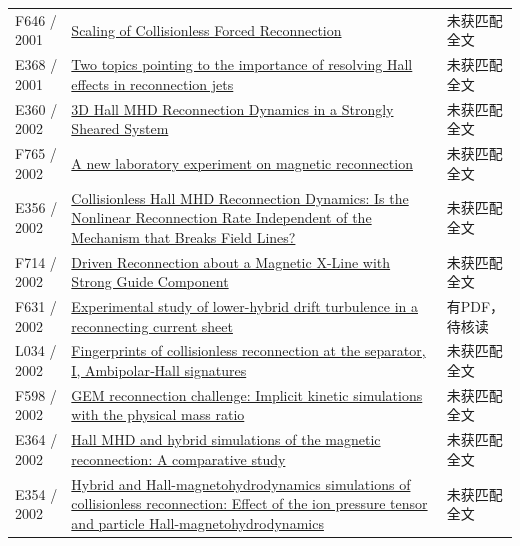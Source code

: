 \documentclass[UTF8,a4paper,11pt,openany,fontset=fandol]{ctexbook}
\begin{document}
\begin{longtable}{P{24mm}P{97mm}P{27mm}}
F646 / 2001 & \href{https://doi.org/10.1103/physrevlett.87.265003}{Scaling of Collisionless Forced Reconnection} & 未获匹配全文\\

E368 / 2001 & \href{https://ui.adsabs.harvard.edu/abs/2001sps..proc..140F/abstract}{Two topics pointing to the importance of resolving Hall effects in reconnection jets} & 未获匹配全文\\

E360 / 2002 & \href{http://ui.adsabs.harvard.edu/abs/2002AGUFMSM61A0471H/abstract}{3D Hall MHD Reconnection Dynamics in a Strongly Sheared System} & 未获匹配全文\\

F765 / 2002 & \href{https://doi.org/10.1063/1.1459455}{A new laboratory experiment on magnetic reconnection} & 未获匹配全文\\

E356 / 2002 & \href{https://ui.adsabs.harvard.edu/abs/2002AGUFMSM61A0472B/abstract}{Collisionless Hall MHD Reconnection Dynamics: Is the Nonlinear Reconnection Rate Independent of the Mechanism that Breaks Field Lines?} & 未获匹配全文\\

F714 / 2002 & \href{https://doi.org/10.1103/physrevlett.89.055002}{Driven Reconnection about a Magnetic X-Line with Strong Guide Component} & 未获匹配全文\\

F631 / 2002 & \href{https://doi.org/10.1063/1.1494433}{Experimental study of lower-hybrid drift turbulence in a reconnecting current sheet} & 有PDF，待核读\\

L034 / 2002 & \href{https://doi.org/10.1029/2001ja000126}{Fingerprints of collisionless reconnection at the separator,  I,  Ambipolar‐Hall signatures} & 未获匹配全文\\

F598 / 2002 & \href{https://doi.org/10.1029/2002gl015314}{GEM reconnection challenge: Implicit kinetic simulations with the physical mass ratio} & 未获匹配全文\\

E364 / 2002 & \href{https://ui.adsabs.harvard.edu/abs/2002AGUFMSM61A0480K/abstract}{Hall MHD and hybrid simulations of the magnetic reconnection: A comparative study} & 未获匹配全文\\

E354 / 2002 & \href{https://doi.org/10.1063/1.1474424}{Hybrid and Hall-magnetohydrodynamics simulations of collisionless reconnection: Effect of the ion pressure tensor and particle Hall-magnetohydrodynamics} & 未获匹配全文\\


\end{longtable}
\end{document}
